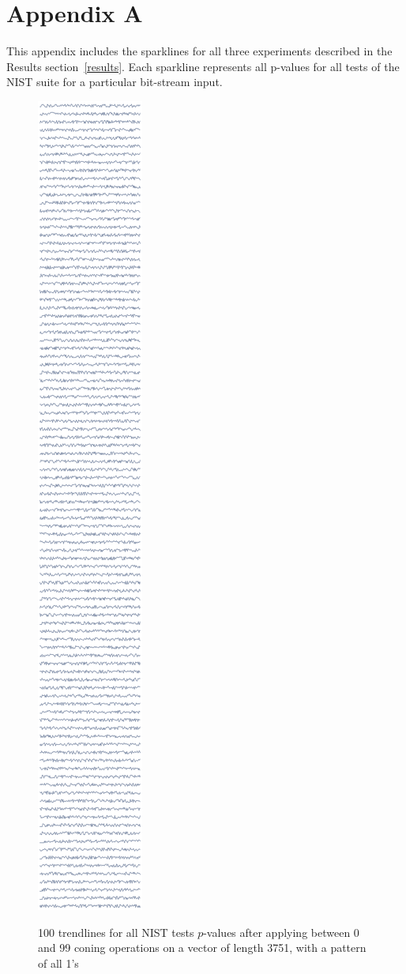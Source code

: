 \documentclass[oneside,12pt]{amsart}
\theoremstyle{definition}
\numberwithin{equation}{section}
\begin{document}
\section{Appendix A} \label{first-appendix}
This appendix includes the sparklines for all three experiments described in the Results section~\ref{results}. Each sparkline represents all p-values for all tests of the NIST suite for a particular bit-stream input.

\begin{figure}[h!]
\centering
\caption{100 trendlines for all NIST tests $p$-values after applying between 0 and 99 coning operations on a vector of length 3751, with a pattern of all 1's}
\includegraphics[width=0.2\linewidth, height=1.2\linewidth]{./charts/varying-conings-v2-alt.png}
\label{fig:conings}
\end{figure}
\end{document}
